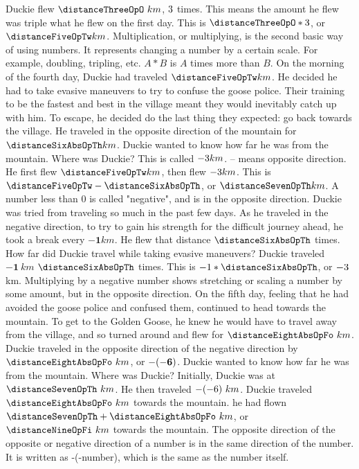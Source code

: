 {Duckie flew $\distanceThreeOpO~km$, $3$ times. This means the amount he flew was triple what he flew on the first day. This is $\distanceThreeOpO \ast \distanceFourOpTw$, or $\distanceFiveOpTw km$.}
{Multiplication, or multiplying, is the second basic way of using numbers. It represents changing a number by a certain scale. For example, doubling, tripling, etc. $A\ast B$ is $A$ times more than $B$.}
{}
{On the morning of the fourth day, Duckie had traveled $\distanceFiveOpTw km$. He decided he had to take evasive maneuvers to try to confuse the goose police. Their training to be the fastest and best in the village meant they would inevitably catch up with him. To escape, he decided do the last thing they expected: go back towards the village. He traveled in the opposite direction of the mountain for $\distanceSixAbsOpTh km$. Duckie wanted to know how far he was from the mountain. Where was Duckie?}
{This is called $-3 km$. \linebreak – means opposite direction.  He first flew $\distanceFiveOpTw km$, then flew $-3 km$. This is$ \distanceFiveOpTw - \distanceSixAbsOpTh$, or $\distanceSevenOpTh km$.}
{A number less than 0 is called "negative", and is in the opposite direction.}
{}
{Duckie was tried from traveling so much in the past few days. As he traveled in the negative direction, to try to gain his strength for the difficult journey ahead, he took a break every $\mathbf{-1} km$. He flew that distance $\distanceSixAbsOpTh$ times. How far did Duckie travel while taking evasive maneuvers?}
{Duckie traveled $\mathbf{-1}~km$ $\distanceSixAbsOpTh$ times. This is ${-1}\ast\distanceSixAbsOpTh$, or $-3$ km.}
{Multiplying by a negative number shows stretching or scaling a number by some amount, but in the opposite direction.}
{}
{On the fifth day, feeling that he had avoided the goose police and confused them, continued to head towards the mountain. To get to the Golden Goose, he knew he would have to travel away from the village, and so turned around and flew for $\distanceEightAbsOpFo~km$. Duckie traveled in the opposite direction of the negative direction by $\distanceEightAbsOpFo~km$, or $\mathbf{-(-6)}$. Duckie wanted to know how far he was from the mountain. Where was Duckie?}
{Initially, Duckie was at $\distanceSevenOpTh~km$. He then traveled $-(-6)~km$. Duckie traveled $\distanceEightAbsOpFo~km$ towards the mountain. he had flown $\distanceSevenOpTh+\distanceEightAbsOpFo~km$, or $\distanceNineOpFi~km$ towards the mountain.}
{The opposite direction of the opposite or negative direction of a number is in the same direction of the number. It is written as -(-number), which is the same as the number itself.}
{}
